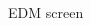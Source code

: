 \documentclass[final,t]{beamer}
\begin{document}
\begin{frame}
\begin{columns}[t]
\begin{column}{.32\linewidth}
      \begin{figure}[t]
          {%
        \setlength{\fboxsep}{0pt}%
        \setlength{\fboxrule}{3pt}%
              \caption{EDM screen}
        }%
\centering
\end{figure}

  \end{column}

  

  \begin{column}{.32\linewidth}


\end{column}
\end{columns}
\end{frame}
\end{document}
